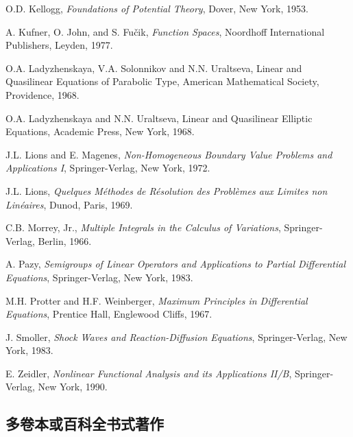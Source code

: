 \begin{list}{}{\setlength{\labelwidth}{3em}\setlength{\leftmargin}{4em}\setlength{\labelsep}{.8em}}
\item[{[Ke]}] O.D. Kellogg, \emph{Foundations of Potential Theory}, Dover, New York, 1953.

\item[{[KJF]}] A. Kufner, O. John, and S. Fučik, \emph{Function Spaces}, Noordhoff International Publishers, Leyden, 1977.

\item[{[LSU]}] O.A. Ladyzhenskaya, V.A. Solonnikov and N.N. Uraltseva, Linear and Quasilinear Equations of Parabolic Type, American Mathematical Society, Providence, 1968.

\item[{[LU]}] O.A. Ladyzhenskaya and N.N. Uraltseva, Linear and Quasilinear Elliptic Equations, Academic Press, New York, 1968.

\item[{[LM]}] J.L. Lions and E. Magenes, \emph{Non-Homogeneous Boundary Value Problems and Applications I}, Springer-Verlag, New York, 1972.

\item[{[Li]}] J.L. Lions, \emph{Quelques Méthodes de Résolution des Problèmes aux Limites non Linéaires}, Dunod, Paris, 1969.

\item[{[Mor]}] C.B. Morrey, Jr., \emph{Multiple Integrals in the Calculus of Variations}, Springer-Verlag, Berlin, 1966.

\item[{[Pa]}] A. Pazy, \emph{Semigroups of Linear Operators and Applications to Partial Differential Equations}, Springer-Verlag, New York, 1983.

\item[{[PW]}] M.H. Protter and H.F. Weinberger, \emph{Maximum Principles in Differential Equations}, Prentice Hall, Englewood Cliffs, 1967.

\item[{[Sm]}] J. Smoller, \emph{Shock Waves and Reaction-Diffusion Equations}, Springer-Verlag, New York, 1983.

\item[{[Ze]}] E. Zeidler, \emph{Nonlinear Functional Analysis and its Applications II/B}, Springer-Verlag, New York, 1990.
\end{list}

\subsection{多卷本或百科全书式著作}\label{sec:references-multivolume-encyclopedic-works}

